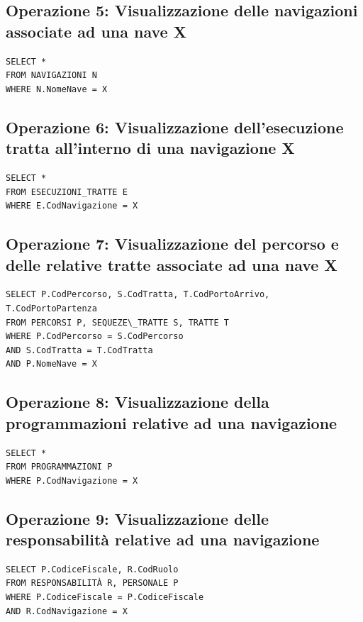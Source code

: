 \documentclass[a4paper, titlepage]{report}
\begin{document}
\vspace{0.5cm}
\subsection*{Operazione 5: Visualizzazione delle navigazioni associate ad una nave X}
\begin{lstlisting}
SELECT *
FROM NAVIGAZIONI N
WHERE N.NomeNave = X
\end{lstlisting}

\vspace{0.5cm}
\subsection*{Operazione 6: Visualizzazione dell'esecuzione tratta all'interno di una navigazione X}
\begin{lstlisting}
SELECT *
FROM ESECUZIONI_TRATTE E
WHERE E.CodNavigazione = X
\end{lstlisting}

\vspace{0.5cm}
\subsection*{Operazione 7: Visualizzazione del percorso e delle relative tratte associate ad una nave X}
\begin{lstlisting}
SELECT P.CodPercorso, S.CodTratta, T.CodPortoArrivo, T.CodPortoPartenza
FROM PERCORSI P, SEQUEZE\_TRATTE S, TRATTE T
WHERE P.CodPercorso = S.CodPercorso
AND S.CodTratta = T.CodTratta
AND P.NomeNave = X
\end{lstlisting}

\vspace{0.5cm}
\subsection*{Operazione 8: Visualizzazione della programmazioni relative ad una navigazione}
\begin{lstlisting}
SELECT *
FROM PROGRAMMAZIONI P
WHERE P.CodNavigazione = X
\end{lstlisting}

\newpage
\subsection*{Operazione 9: Visualizzazione delle responsabilità relative ad una navigazione}
\begin{lstlisting}
SELECT P.CodiceFiscale, R.CodRuolo
FROM RESPONSABILITÀ R, PERSONALE P
WHERE P.CodiceFiscale = P.CodiceFiscale
AND R.CodNavigazione = X
\end{lstlisting}
\end{document}
